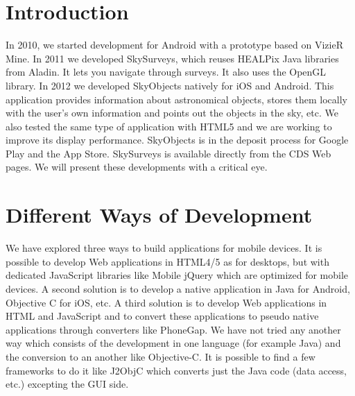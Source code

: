 \section{Introduction}
In 2010, we started development for Android with a prototype based on VizieR Mine. In 2011 we developed SkySurveys, which reuses HEALPix Java libraries from Aladin. It lets you navigate through surveys. It also uses the OpenGL library. In 2012 we developed SkyObjects natively for iOS and Android. This application provides information about astronomical objects, stores them locally with the user's own information and points out the objects in the sky, etc. We also tested the same type of application with HTML5 and we are working to improve its display performance. SkyObjects is in the deposit process for Google Play and the App Store. SkySurveys is available directly from the CDS Web pages. We will present these developments with a critical eye. 

\section{Different Ways of Development}

We have explored three ways to build applications for mobile devices.
It is possible to develop Web applications in HTML4/5 as for desktops, but with dedicated JavaScript libraries like Mobile jQuery which are optimized for mobile devices. A second solution is to develop a native application in Java for Android, Objective C for iOS, etc. 
A third solution is to develop Web applications in HTML and JavaScript and to convert these applications to pseudo native applications through converters like PhoneGap. We have not tried any another way which consists of the development in one language (for example Java) and the conversion to an another like Objective-C. It is possible to find a few frameworks to do it like J2ObjC which converts just the Java code (data access, etc.) excepting the GUI side.

